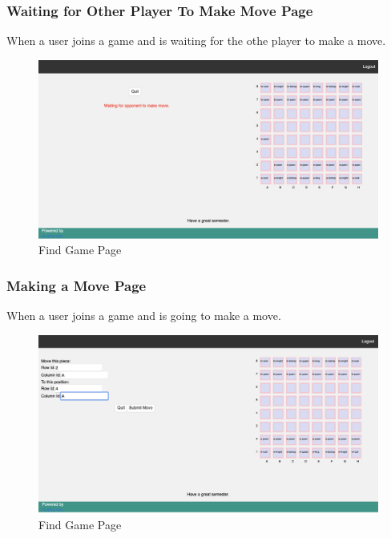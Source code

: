 \documentclass[12pt]{article}
\begin{document}
\subsubsection{Waiting for Other Player To Make Move Page}
When a user joins a game and is waiting for the othe player to make a move.
\begin{figure}[h!]
    \includegraphics[width=\linewidth]{PLAYER_WAITING_FOR_OTHER_TO_MAKE_MOVE_AFTER_MAKIN_MOVE.png}
    \caption{Find Game Page}
\end{figure}

\subsubsection{Making a Move Page}
When a user joins a game and is going to make a move.
\begin{figure}[h!]
    \includegraphics[width=\linewidth]{MAKING_MOVE.png}
    \caption{Find Game Page}
\end{figure}
\newpage
\end{document}
